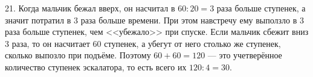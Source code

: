 21. Когда мальчик бежал вверх, он насчитал в $60:20=3$ раза больше ступенек, а значит потратил в 3 раза больше времени. При этом навстречу ему выползло в 3 раза больше ступенек, чем <<убежало>> при спуске. Если мальчик сбежит вниз 3 раза, то он насчитает 60 ступенек, а убегут от него столько же ступенек, сколько выпозло при подъёме. Поэтому $60+60=120$ --- это учетверённое количество ступенек эскалатора, то есть всего их $120:4=30.$\\
